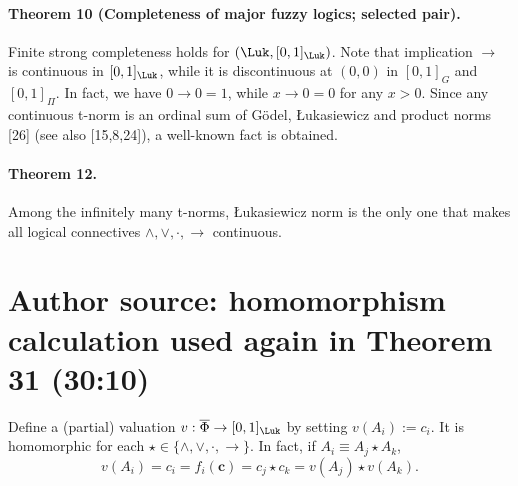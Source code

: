 \paragraph{Theorem 10 (Completeness of major fuzzy logics; selected pair).}
Finite strong completeness holds for $(\Luk,[0,1]_{\Luk})$.
Note that implication $\to$ is continuous in $[0,1]_{\Luk}$, while it is discontinuous at $(0,0)$ in $[0,1]_G$ and $[0,1]_{\Pi}$. In fact, we have $0\to0=1$, while $x\to0=0$ for any $x>0$. Since any continuous t-norm is an ordinal sum of Gödel, Łukasiewicz and product norms [26] (see also [15,8,24]), a well-known fact is obtained.
\paragraph{Theorem 12.} Among the infinitely many t-norms, Łukasiewicz norm is the only one that makes all logical connectives $\wedge,\vee,\cdot,\to$ continuous.
\section*{Author source: homomorphism calculation used again in Theorem 31 (30:10)}
Define a (partial) valuation $v:\overline\Phi\to[0,1]_{\Luk}$ by setting $v(A_i):=c_i$. It is homomorphic for each $\star\in\{\wedge,\vee,\cdot,\to\}$. In fact, if $A_i\equiv A_j\star A_k$,
\[
v(A_i)=c_i=f_i(\mathbf c)=c_j\star c_k=v(A_j)\star v(A_k).
\]
